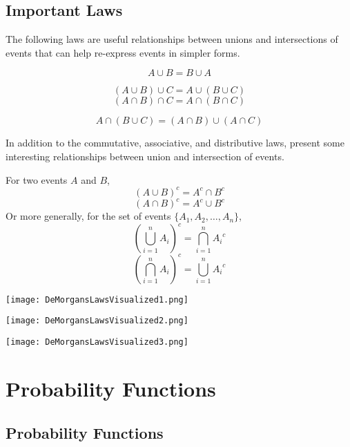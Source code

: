 \subsection{Important Laws}

The following laws are useful relationships between unions and intersections of events that can help re-express events in simpler forms.

\begin{theorem}
    $$A \cup B = B \cup A$$
\end{theorem}

\begin{theorem}
    $$(A \cup B) \cup C = A \cup (B \cup C)$$
    $$(A \cap B) \cap C = A \cap (B \cap C)$$
\end{theorem}

\begin{theorem}
    $$A \cap (B \cup C) = (A \cap B) \cup (A \cap C)$$
\end{theorem}

In addition to the commutative, associative, and distributive laws,  present some interesting relationships between union and intersection of events.

\begin{theorem}
    For two events $A$ and $B$, 
    $$(A \cup B)^c = A^c \cap B^c$$
    $$(A \cap B)^c = A^c \cup B^c$$
    Or more generally, for the set of events $\{ A_1, A_2, \dots, A_n \}$, 
    $$\left( \bigcup_{i=1}^n A_i \right)^c = \bigcap_{i=1}^n {A_i}^c$$
    $$\left( \bigcap_{i=1}^n A_i \right)^c = \bigcup_{i=1}^n {A_i}^c$$
\end{theorem}

\begin{center}
    \texttt{[image: DeMorgansLawsVisualized1.png]}

    \texttt{[image: DeMorgansLawsVisualized2.png]}

    \texttt{[image: DeMorgansLawsVisualized3.png]}
\end{center}

\section{Probability Functions}

\subsection{Probability Functions}

